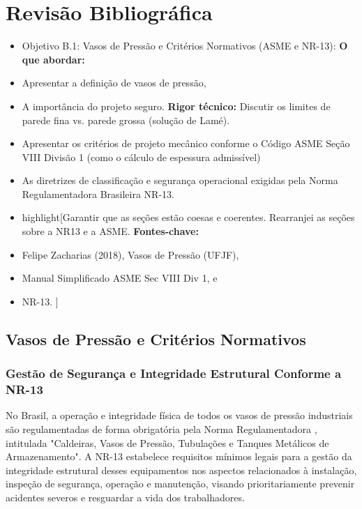 \chapter{Revisão Bibliográfica}


\begin{itemize}
  \item Objetivo B.1: Vasos de Pressão e Critérios Normativos (ASME e NR-13):
    \textbf{ O que abordar:}
  \item Apresentar a definição de vasos de pressão,
  \item A importância do projeto seguro.
    \textbf{ Rigor técnico:} Discutir os limites de parede fina vs. parede grossa (solução de Lamé).
  \item Apresentar os critérios de projeto mecânico conforme o Código ASME Seção VIII Divisão 1 (como o cálculo de espessura admissível)
  \item As diretrizes de classificação e segurança operacional exigidas pela Norma Regulamentadora Brasileira NR-13.
  \item highlight[Garantir que as seções estão coesas e coerentes. Rearranjei as seções sobre a NR13 e a ASME.
    \textbf{ Fontes-chave:}
  \item Felipe Zacharias (2018), Vasos de Pressão (UFJF),
  \item Manual Simplificado ASME Sec VIII Div 1, e
  \item NR-13.
]
\end{itemize}

\section{Vasos de Pressão e Critérios Normativos}

\subsection{Gestão de Segurança e Integridade Estrutural Conforme a NR-13}

No Brasil, a operação e integridade física de todos os vasos de pressão industriais são regulamentadas de forma obrigatória pela Norma Regulamentadora \cite{brasil_nr13_2022}, intitulada "Caldeiras, Vasos de Pressão, Tubulações e Tanques Metálicos de Armazenamento". A NR-13 estabelece requisitos mínimos legais para a gestão da integridade estrutural desses equipamentos nos aspectos relacionados à instalação, inspeção de segurança, operação e manutenção, visando prioritariamente prevenir acidentes severos e resguardar a vida dos trabalhadores.

